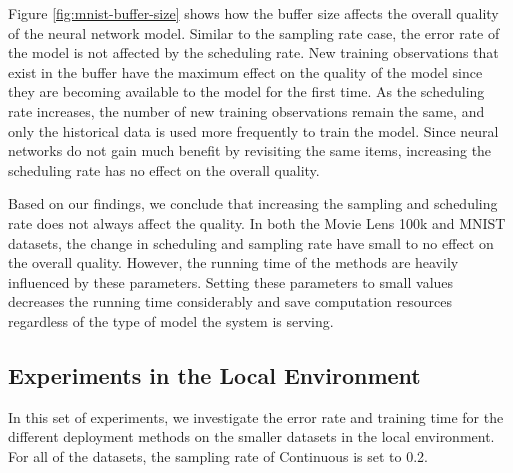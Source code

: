 \documentclass[10pt,conference,letterpaper]{IEEEtran}
\begin{document}
Figure \ref{fig:mnist-buffer-size} shows how the buffer size affects the overall quality of the neural network model.
Similar to the sampling rate case, the error rate of the model is not affected by the scheduling rate.
New training observations that exist in the buffer have the maximum effect on the quality of the model since they are becoming available to the model for the first time.
As the scheduling rate increases, the number of new training observations remain the same, and only the historical data is used more frequently to train the model.
Since neural networks do not gain much benefit by revisiting the same items, increasing the scheduling rate has no effect on the overall quality.

Based on our findings, we conclude that increasing the sampling and scheduling rate does not always affect the quality.
In both the Movie Lens 100k and MNIST datasets, the change in scheduling and sampling rate have small to no effect on the overall quality.
However, the running time of the methods are heavily influenced by these parameters.
Setting these parameters to small values decreases the running time considerably and save computation resources regardless of the type of model the system is serving.

\subsection{Experiments in the Local Environment}\label{subsec:experiment-local}
In this set of experiments, we investigate the error rate and training time for the different deployment methods on the smaller datasets in the local environment.
For all of the datasets, the sampling rate of Continuous is set to 0.2.
\end{document}
